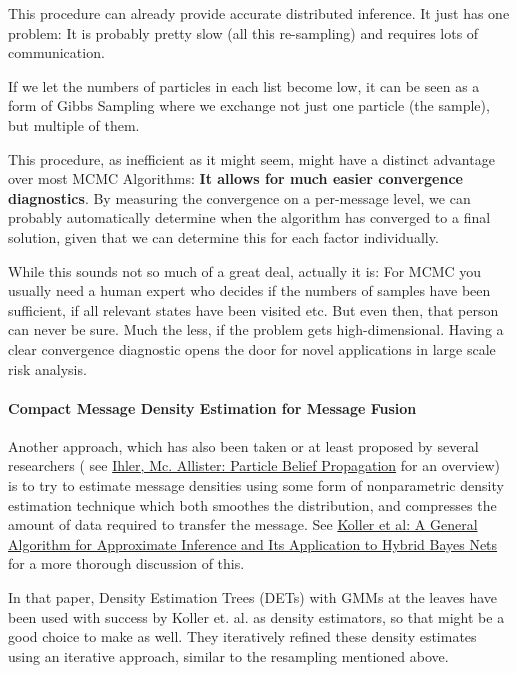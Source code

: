 \documentclass[letterpaper,10pt,english]{/home/londenberg/python-env/clean/lib/python2.7/site-packages/sphinx/texinputs/sphinxhowto}
\begin{document}
This procedure can already provide accurate distributed inference. It
just has one problem: It is probably pretty slow (all this re-sampling)
and requires lots of communication.

If we let the numbers of particles in each list become low, it can be
seen as a form of Gibbs Sampling where we exchange not just one particle
(the sample), but multiple of them.

This procedure, as inefficient as it might seem, might have a distinct
advantage over most MCMC Algorithms: \textbf{It allows for much easier
convergence diagnostics}. By measuring the convergence on a per-message
level, we can probably automatically determine when the algorithm has
converged to a final solution, given that we can determine this for each
factor individually.

While this sounds not so much of a great deal, actually it is: For MCMC
you usually need a human expert who decides if the numbers of samples
have been sufficient, if all relevant states have been visited etc. But
even then, that person can never be sure. Much the less, if the problem
gets high-dimensional. Having a clear convergence diagnostic opens the
door for novel applications in large scale risk analysis.\paragraph{Compact Message Density Estimation for Message Fusion}

Another approach, which has also been taken or at least proposed by
several researchers ( see
\href{http://machinelearning.wustl.edu/mlpapers/paper\_files/AISTATS09\_IhlerM.pdf}{Ihler,
Mc. Allister: Particle Belief Propagation} for an overview) is to try to
estimate message densities using some form of nonparametric density
estimation technique which both smoothes the distribution, and
compresses the amount of data required to transfer the message. See
\href{http://robotics.stanford.edu/~koller/Papers/Koller+al:UAI99.pdf}{Koller
et al: A General Algorithm for Approximate Inference and Its Application
to Hybrid Bayes Nets} for a more thorough discussion of this.

In that paper, Density Estimation Trees (DETs) with GMMs at the leaves
have been used with success by Koller et. al. as density estimators, so
that might be a good choice to make as well. They iteratively refined
these density estimates using an iterative approach, similar to the
resampling mentioned above.
\end{document}
